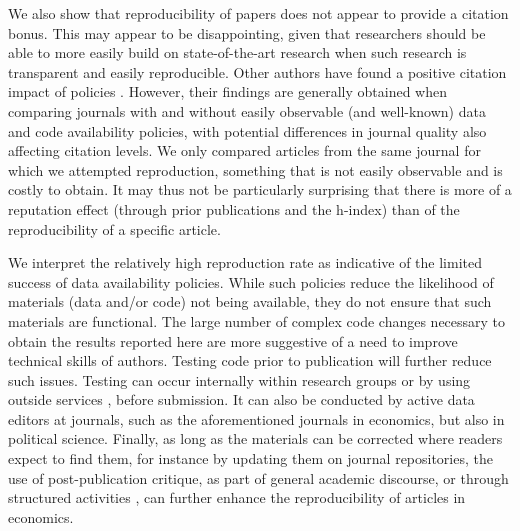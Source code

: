 We also show that reproducibility of papers does not appear to provide a citation bonus. This may appear to be disappointing, given that researchers should be able to more easily build on state-of-the-art research when such research is  transparent and easily reproducible. 
Other authors have found a positive citation impact of policies \citep{gleditsch2003,Hoeffler2017}. However, their findings are generally obtained when comparing journals with and without easily observable (and well-known) data and code availability policies, with potential differences in journal quality also affecting citation levels. We only compared articles from the same journal for which we attempted reproduction, something that is not easily observable and is costly to obtain. It may thus not be particularly surprising that there is more of a reputation effect (through prior publications and the h-index) than of the reproducibility of a specific article.

We interpret the relatively high reproduction rate as indicative of the limited success of data availability policies. While such policies reduce the likelihood of materials (data and/or code) not being available, they do not ensure that such materials are functional. The large number of complex code changes necessary to obtain the results reported here are more suggestive of a need to improve technical skills of authors. Testing code prior to publication will further reduce such issues. Testing can occur internally within research groups or by using outside services \citep{perignon2019a}, before submission. It can also be conducted by active data editors at journals, such as the aforementioned journals in economics, but also in political science. Finally, as long as the materials can be corrected where readers expect to find them, for instance by updating them on journal repositories, the use of post-publication critique, as part of general academic discourse, or through structured activities \citep{brodeur2023}, can further enhance the reproducibility of articles in economics.